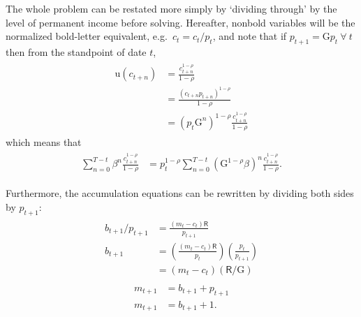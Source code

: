 \documentclass{scrartcl}
\begin{document}
The whole problem can be restated more simply by `dividing through' by the level of
permanent income before solving.
Hereafter, nonbold variables will be
the normalized bold-letter equivalent, e.g.\
$c_{t}=\boldsymbol{\mathit{c}}_{t}/\boldsymbol{\mathit{p}}_{t}$, and note that if
$\boldsymbol{\mathit{p}}_{t+1}={\ensuremath{\mathrm{G}}} \boldsymbol{\mathit{p}}_{t}~\forall~t$ then from the standpoint
of date $t$,
\begin{equation}\begin{gathered}\begin{aligned}
        \mathrm{u}(\boldsymbol{\mathit{c}}_{t+n}) & =  \frac{\boldsymbol{\mathit{c}}_{t+n}^{1-\rho}}{1-\rho}  \\
         & =  \frac{(c_{t+n}\boldsymbol{\mathit{p}}_{t+n})^{1-\rho}}{1-\rho}  \\
         & =  (\boldsymbol{\mathit{p}}_{t}{\ensuremath{\mathrm{G}}}^{n})^{1-\rho}\frac{c_{t+n}^{1-\rho}}{1-\rho}
\end{aligned}\end{gathered}\end{equation}
which means that 
\begin{equation}\begin{gathered}\begin{aligned}
        \sum_{n=0}^{T-t} \beta^{n}\frac{\boldsymbol{\mathit{c}}_{t+n}^{1-\rho}}{1-\rho} & =  \boldsymbol{\mathit{p}}_{t}^{1-\rho}\sum_{n=0}^{T-t} ({\ensuremath{\mathrm{G}}}^{1-\rho}\beta)^{n} \frac{c_{t+n}^{1-\rho}}{1-\rho}  \label{eq:maxc2}
.
\end{aligned}\end{gathered}\end{equation}

Furthermore, the accumulation equations can be rewritten by dividing
both sides by $\boldsymbol{\mathit{p}}_{t+1}$:
\begin{equation}\begin{gathered}\begin{aligned}
        \boldsymbol{\mathit{b}}_{t+1}/\boldsymbol{\mathit{p}}_{t+1} & =  \frac{(\boldsymbol{\mathit{m}}_{t}-\boldsymbol{\mathit{c}}_{t})\mathsf{R}}{\boldsymbol{\mathit{p}}_{t+1}}  \\
        b_{t+1} & =   \left(\frac{(\boldsymbol{\mathit{m}}_{t}-\boldsymbol{\mathit{c}}_{t})\mathsf{R}}{\boldsymbol{\mathit{p}}_{t}}\right)\left(\frac{\boldsymbol{\mathit{p}}_{t}}{\boldsymbol{\mathit{p}}_{t+1}}\right) \\
         & =  (m_{t}-c_{t})(\mathsf{R}/{\ensuremath{\mathrm{G}}})
\end{aligned}\end{gathered}\end{equation}
\begin{equation}\begin{gathered}\begin{aligned}
        \boldsymbol{\mathit{m}}_{t+1} & =  \boldsymbol{\mathit{b}}_{t+1}+\boldsymbol{\mathit{p}}_{t+1}
\\      m_{t+1} & =  b_{t+1}+1.
\end{aligned}\end{gathered}\end{equation}
\end{document}
